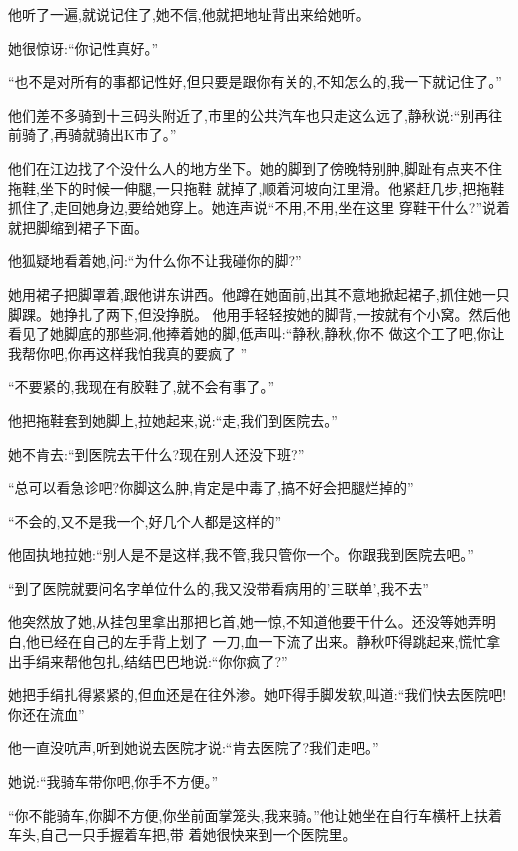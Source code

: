 ﻿\documentclass[12pt]{article}
\begin{document}
他听了一遍,就说记住了,她不信,他就把地址背出来给她听。

她很惊讶:``你记性真好。''

``也不是对所有的事都记性好,但只要是跟你有关的,不知怎么的,我一下就记住了。''

他们差不多骑到十三码头附近了,市里的公共汽车也只走这么远了,静秋说:``别再往前骑了,再骑就骑出K市了。''



他们在江边找了个没什么人的地方坐下。她的脚到了傍晚特别肿,脚趾有点夹不住拖鞋,坐下的时候一伸腿,一只拖鞋
就掉了,顺着河坡向江里滑。他紧赶几步,把拖鞋抓住了,走回她身边,要给她穿上。她连声说``不用,不用,坐在这里
穿鞋干什么?''说着就把脚缩到裙子下面。

他狐疑地看着她,问:``为什么你不让我碰你的脚?''

她用裙子把脚罩着,跟他讲东讲西。他蹲在她面前,出其不意地掀起裙子,抓住她一只脚踝。她挣扎了两下,但没挣脱。
他用手轻轻按她的脚背,一按就有个小窝。然后他看见了她脚底的那些洞,他捧着她的脚,低声叫:``静秋,静秋,你不
\myrule 做这个工了吧,你\myrule 让我\myrule 帮你吧,你再这样\myrule 我怕我\myrule 真的要\myrule 疯了
\myrule ''

``不要紧的,我现在有胶鞋了,就不会有事了。''

他把拖鞋套到她脚上,拉她起来,说:``走,我们到医院去。''

她不肯去:``到医院去干什么?现在别人还没下班?''

``总可以看急诊吧?你脚这么肿,肯定是中毒了,搞不好会把腿烂掉的\myrule ''

``不会的,又不是我一个,好几个人都是这样的\myrule ''

他固执地拉她:``别人是不是这样,我不管,我只管你一个。你跟我到医院去吧。''

``到了医院就要问名字单位什么的,我又没带看病用的'三联单',我不去\myrule ''

他突然放了她,从挂包里拿出那把匕首,她一惊,不知道他要干什么。还没等她弄明白,他已经在自己的左手背上划了
一刀,血一下流了出来。静秋吓得跳起来,慌忙拿出手绢来帮他包扎,结结巴巴地说:``你\myrule 你\myrule 疯了?''

她把手绢扎得紧紧的,但血还是在往外渗。她吓得手脚发软,叫道:``我们快去医院吧!你还在流血\myrule ''

他一直没吭声,听到她说去医院才说:``肯去医院了?我们走吧。''

她说:``我骑车带你吧,你手不方便。''

``你不能骑车,你脚不方便,你坐前面掌笼头,我来骑。''他让她坐在自行车横杆上扶着车头,自己一只手握着车把,带
着她很快来到一个医院里。
\end{document}
